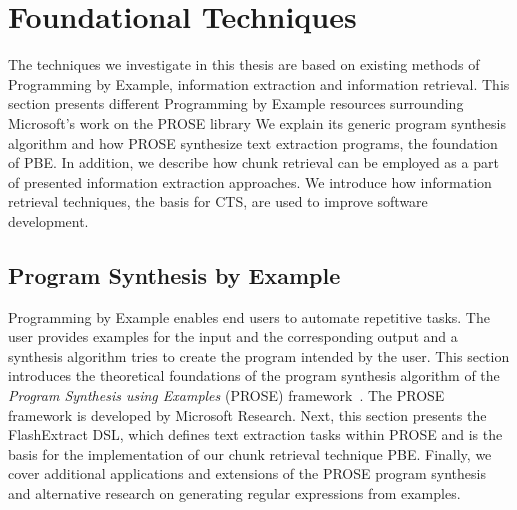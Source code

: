 \documentclass[\myrootdir/main.tex]{subfiles}
\begin{document}
\section{Foundational Techniques}
The techniques we investigate in this thesis are based on existing methods of Programming by Example, information extraction and information retrieval.
This section presents different Programming by Example resources surrounding Microsoft's work on the PROSE library
We explain its generic program synthesis algorithm and how PROSE synthesize text extraction programs, the foundation of PBE\@.
In addition, we describe how chunk retrieval can be employed as a part of presented information extraction approaches.
We introduce how information retrieval techniques, the basis for CTS, are used to improve software development.


\subsection{Program Synthesis by Example}
\label{sec:rw-prose}
Programming by Example enables end users to automate repetitive tasks.
The user provides examples for the input and the corresponding output and a synthesis algorithm tries to create the program intended by the user.
This section introduces the theoretical foundations of the program synthesis algorithm of the \emph{Program Synthesis using Examples} (PROSE) framework~\cite{prose2019webpage}.
The PROSE framework is developed by Microsoft Research.
Next, this section presents the FlashExtract DSL, which defines text extraction tasks within PROSE and is the basis for the implementation of our chunk retrieval technique PBE\@.
Finally, we cover additional applications and extensions of the PROSE program synthesis and alternative research on generating regular expressions from examples.
\end{document}
